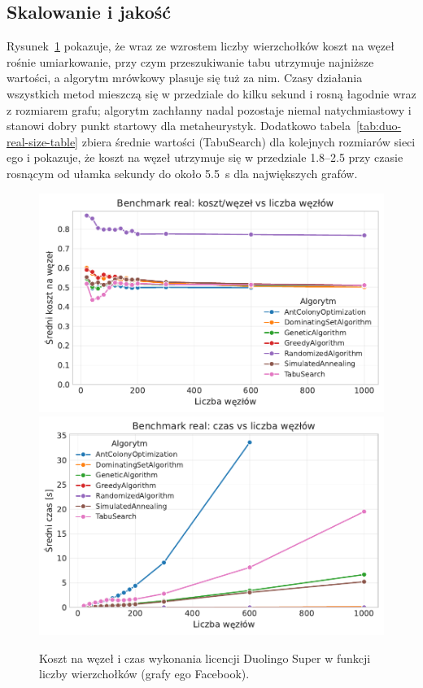\subsection{Skalowanie i jakość}

Rysunek~\ref{fig:duo-real-size} pokazuje, że wraz ze wzrostem liczby wierzchołków koszt na węzeł rośnie umiarkowanie, przy czym przeszukiwanie tabu utrzymuje najniższe wartości, a algorytm mrówkowy plasuje się tuż za nim. Czasy działania wszystkich metod mieszczą się w przedziale do kilku sekund i rosną łagodnie wraz z rozmiarem grafu; algorytm zachłanny nadal pozostaje niemal natychmiastowy i stanowi dobry punkt startowy dla metaheurystyk. Dodatkowo tabela~\ref{tab:duo-real-size-table} zbiera średnie wartości (TabuSearch) dla kolejnych rozmiarów sieci ego i pokazuje, że koszt na węzeł utrzymuje się w przedziale 1.8--2.5 przy czasie rosnącym od ułamka sekundy do około 5.5~s dla największych grafów.

\begin{figure}[H]
  \centering
  \includegraphics[width=0.48\linewidth]{assets/figures/benchmark/real/cost_per_node_vs_nodes.pdf}
  \hfill
  \includegraphics[width=0.48\linewidth]{assets/figures/benchmark/real/time_vs_nodes.pdf}
  \caption{Koszt na węzeł i czas wykonania licencji Duolingo Super w funkcji liczby wierzchołków (grafy ego Facebook).}
  \label{fig:duo-real-size}
\end{figure}


